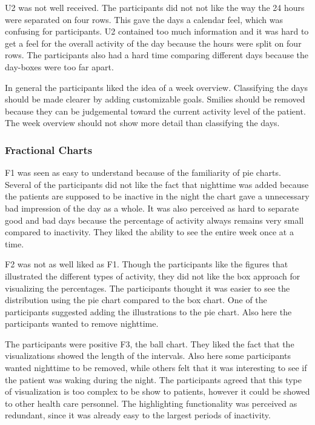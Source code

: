 U2 was not well received. The participants did not not like the way the 24 hours were separated on four rows. This gave the days a calendar feel, which was confusing for participants. U2 contained too much information and it was hard to get a feel for the overall activity of the day because the hours were split on four rows. The participants also had a hard time comparing different days because the day-boxes were too far apart.

In general the participants liked the idea of a week overview. Classifying the days should be made clearer by adding customizable goals. Smilies should be removed because they can be judgemental toward the current activity level of the patient. The week overview should not show more detail than classifying the days.

\subsubsection{Fractional Charts}
F1 was seen as easy to understand because of the familiarity of pie charts. Several of the participants did not like the fact that nighttime was added because the patients are supposed to be inactive in the night the chart gave a unnecessary bad impression of the day as a whole. It was also perceived as hard to separate good and bad days because the percentage of activity always remains very small compared to inactivity. They liked the ability to see the entire week once at a time.

F2 was not as well liked as F1. Though the participants like the figures that illustrated the different types of activity, they did not like the box approach for visualizing the percentages. The participants thought it was easier to see the distribution using the pie chart compared to the box chart. One of the participants suggested adding the illustrations to the pie chart. Also here the participants wanted to remove nighttime.

The participants were positive F3, the ball chart. They liked the fact that the visualizations showed the length of the intervals. Also here some participants wanted nighttime to be removed, while others felt that it was interesting to see if the patient was waking during the night. The participants agreed that this type of visualization is too complex to be show to patients, however it could be showed to other health care personnel. The highlighting functionality was perceived as redundant, since it was already easy to the largest periods of inactivity.

